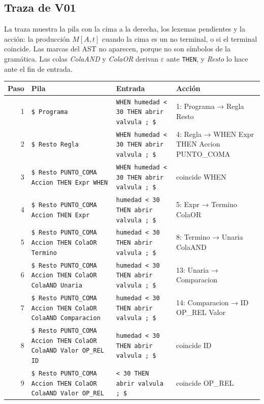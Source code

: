 \documentclass[11pt,a4paper]{article}
\newcommand{\tk}[1]{\texttt{#1}}
\newcommand{\nt}[1]{\textit{#1}}
\begin{document}
\subsection{Traza de V01}

La traza muestra la pila con la cima a la derecha, los lexemas
pendientes y la acción: la producción $M[A, t]$ cuando la cima es
un no terminal, o si el terminal coincide. Las marcas del AST no
aparecen, porque no son símbolos de la gramática. Las colas
\nt{ColaAND} y \nt{ColaOR} derivan $\varepsilon$ ante \tk{THEN}, y
\nt{Resto} lo hace ante el fin de entrada.

\begingroup
\footnotesize
\begin{xltabular}{\textwidth}{r Y{1.3} Y{0.9} Y{0.8}}
  \toprule
  \textbf{Paso} & \textbf{Pila} & \textbf{Entrada} & \textbf{Acción} \\
  \midrule
   & \texttt{\$ Programa} & \texttt{WHEN humedad < 30 THEN abrir
  valvula ; \$} & 1: Programa → Regla Resto \\
  2 & \texttt{\$ Resto Regla} & \texttt{WHEN humedad < 30 THEN
  abrir valvula ; \$} & 4: Regla → WHEN Expr THEN Accion PUNTO\_COMA \\
  3 & \texttt{\$ Resto PUNTO\_\allowbreak{}COMA Accion THEN Expr
  WHEN} & \texttt{WHEN humedad < 30 THEN abrir valvula ; \$} &
  coincide WHEN \\
  4 & \texttt{\$ Resto PUNTO\_\allowbreak{}COMA Accion THEN Expr}
  & \texttt{humedad < 30 THEN abrir valvula ; \$} & 5: Expr →
  Termino ColaOR \\
  5 & \texttt{\$ Resto PUNTO\_\allowbreak{}COMA Accion THEN
  ColaOR Termino} & \texttt{humedad < 30 THEN abrir valvula ; \$}
  & 8: Termino → Unaria ColaAND \\
  6 & \texttt{\$ Resto PUNTO\_\allowbreak{}COMA Accion THEN
  ColaOR ColaAND Unaria} & \texttt{humedad < 30 THEN abrir
  valvula ; \$} & 13: Unaria → Comparacion \\
  7 & \texttt{\$ Resto PUNTO\_\allowbreak{}COMA Accion THEN
  ColaOR ColaAND Comparacion} & \texttt{humedad < 30 THEN abrir
  valvula ; \$} & 14: Comparacion → ID OP\_REL Valor \\
  8 & \texttt{\$ Resto PUNTO\_\allowbreak{}COMA Accion THEN
  ColaOR ColaAND Valor OP\_\allowbreak{}REL ID} & \texttt{humedad
  < 30 THEN abrir valvula ; \$} & coincide ID \\
  9 & \texttt{\$ Resto PUNTO\_\allowbreak{}COMA Accion THEN
  ColaOR ColaAND Valor OP\_\allowbreak{}REL} & \texttt{< 30 THEN
  abrir valvula ; \$} & coincide OP\_REL \\

\end{xltabular}
\end{document}
